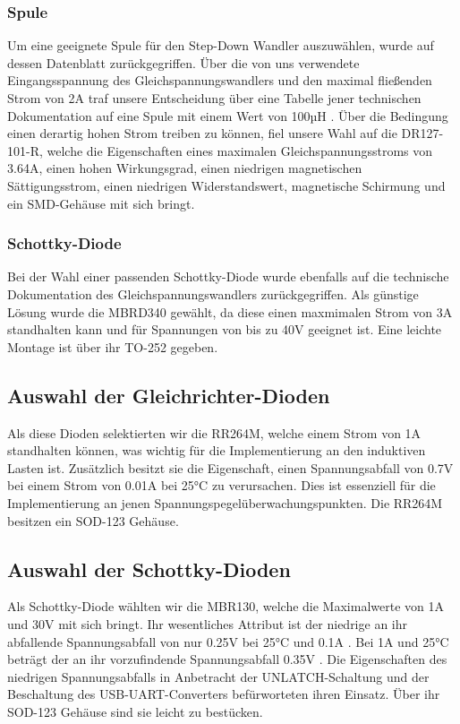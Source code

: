 \subsubsection{Spule}
Um eine geeignete Spule für den Step-Down Wandler auszuwählen, wurde auf dessen Datenblatt zurückgegriffen.
Über die von uns verwendete Eingangsspannung des Gleichspannungswandlers und den maximal fließenden Strom von 2A
traf unsere Entscheidung über eine Tabelle jener technischen Dokumentation auf eine Spule mit einem Wert von 100µH .
Über die Bedingung einen derartig hohen Strom treiben zu können, fiel unsere Wahl auf die DR127-101-R,
welche die Eigenschaften eines maximalen Gleichspannungsstroms von 3.64A, einen hohen Wirkungsgrad, einen niedrigen magnetischen Sättigungsstrom,
einen niedrigen Widerstandswert, magnetische Schirmung und ein \acs{SMD}-Gehäuse mit sich bringt.

\newpage
\subsubsection{Schottky-Diode}
Bei der Wahl einer passenden Schottky-Diode wurde ebenfalls auf die technische Dokumentation des Gleichspannungswandlers zurückgegriffen.
Als günstige Lösung wurde die MBRD340 gewählt, da diese einen maxmimalen Strom von 3A standhalten kann und für Spannungen von bis zu 40V geeignet ist.
Eine leichte Montage ist über ihr TO-252 gegeben.

\subsection{Auswahl der Gleichrichter-Dioden}

Als diese Dioden selektierten wir die RR264M, welche einem Strom von 1A standhalten können, was wichtig für die Implementierung an den induktiven Lasten ist.
Zusätzlich besitzt sie die Eigenschaft, einen Spannungsabfall von 0.7V bei einem Strom von 0.01A bei 25°C zu verursachen.
Dies ist essenziell für die Implementierung an jenen Spannungspegelüberwachungspunkten.
Die RR264M besitzen ein SOD-123 Gehäuse.

\subsection{Auswahl der Schottky-Dioden}

Als Schottky-Diode wählten wir die MBR130, welche die Maximalwerte von 1A und 30V mit sich bringt.
Ihr wesentliches Attribut ist der niedrige an ihr abfallende Spannungsabfall von nur 0.25V bei 25°C und 0.1A .
Bei 1A und 25°C beträgt der an ihr vorzufindende Spannungsabfall 0.35V .
Die Eigenschaften des niedrigen Spannungsabfalls in Anbetracht der UNLATCH-Schaltung und der Beschaltung des USB-UART-Converters befürworteten ihren Einsatz.
Über ihr SOD-123 Gehäuse sind sie leicht zu bestücken.

